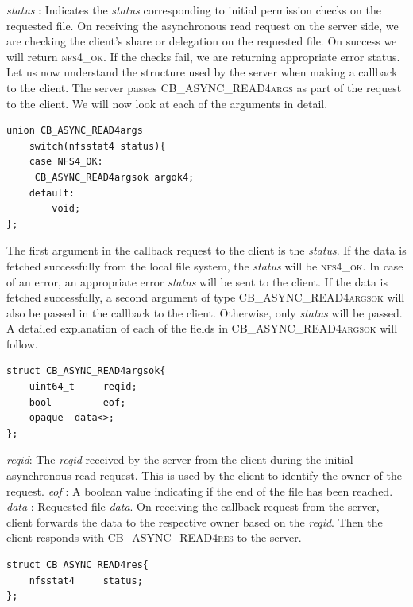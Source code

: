 \textit{status} : Indicates the \textit{status} corresponding to initial permission checks on the requested file.
On receiving the asynchronous read request on the server side, we are checking the client's share or delegation on the requested file. On success we will return \textsc{nfs4\_ok}.  If the checks fail, we are returning appropriate error status.
\hfill \break \newline
\noindent Let us now understand the structure used by the server when making a callback to the client. The server passes \textsc{CB\_ASYNC\_READ4args} as part of the request to the client. We will now look at each of the arguments in detail. 
\begin{lstlisting}
union CB_ASYNC_READ4args 
	switch(nfsstat4 status){
	case NFS4_OK:
	 CB_ASYNC_READ4argsok argok4;
 	default:
		void;
};
\end{lstlisting}

\noindent The first argument in the callback request to the client is the \textit{status}. If the data is fetched successfully from the local file system, the \textit{status} will be \textsc{nfs4\_ok}. In case of an error, an appropriate error \textit{status} will be sent to the client. If the data is fetched successfully, a second argument of type \textsc{CB\_ASYNC\_READ4argsok} will also be passed in the callback to the client. Otherwise, only \textit{status} will be passed. A detailed explanation of each of the fields in \textsc{CB\_ASYNC\_READ4argsok} will follow.

\begin{lstlisting}
struct CB_ASYNC_READ4argsok{
	uint64_t	 reqid;
	bool		 eof;
	opaque	data<>;
};
\end{lstlisting}

\noindent\textit{reqid}: The \textit{reqid} received by the server from the client during the initial asynchronous read request. This is used by the client to identify the owner of the request.
\hfill \break \newline
\noindent\textit{eof} : A boolean value indicating if the end of the file has been reached.
\hfill \break \newline
\noindent\textit{data} : Requested file \textit{data}.
\hfill \break \newline
\noindent On receiving the callback request from the server, client forwards the data to the respective owner based on the \textit{reqid}. Then the client responds with \textsc{CB\_ASYNC\_READ4res} to the server.
 
\begin{lstlisting}
struct CB_ASYNC_READ4res{
	nfsstat4	 status;
};
\end{lstlisting}

